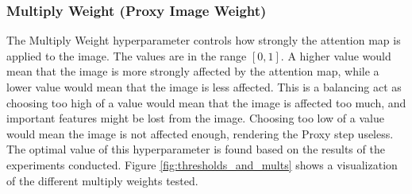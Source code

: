 \documentclass[a4paper,11pt,openright]{book}
\begin{document}
\subsubsection{Multiply Weight (Proxy Image Weight)} \label{sec:mult_weight}
The Multiply Weight hyperparameter controls how strongly the attention map is applied to the image. The values are in the range $[0,1]$. A higher value would mean that the image is more strongly affected by the attention map, while a lower value would mean that the image is less affected. This is a balancing act as choosing too high of a value would mean that the image is affected too much, and important features might be lost from the image. Choosing too low of a value would mean the image is not affected enough, rendering the Proxy step useless. The optimal value of this hyperparameter is found based on the results of the experiments conducted. Figure \ref{fig:thresholds_and_mults} shows a visualization of the different multiply weights tested.
\end{document}
